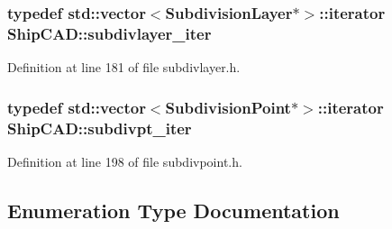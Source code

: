 \subsubsection[{\texorpdfstring{subdivlayer\+\_\+iter}{subdivlayer_iter}}]{\setlength{\rightskip}{0pt plus 5cm}typedef std\+::vector$<${\bf Subdivision\+Layer}$\ast$$>$\+::iterator {\bf Ship\+C\+A\+D\+::subdivlayer\+\_\+iter}}\hypertarget{namespaceShipCAD_a2e2f532082837a6a283b3660d991a974}{}\label{namespaceShipCAD_a2e2f532082837a6a283b3660d991a974}


Definition at line 181 of file subdivlayer.\+h.

\subsubsection[{\texorpdfstring{subdivpt\+\_\+iter}{subdivpt_iter}}]{\setlength{\rightskip}{0pt plus 5cm}typedef std\+::vector$<${\bf Subdivision\+Point}$\ast$$>$\+::iterator {\bf Ship\+C\+A\+D\+::subdivpt\+\_\+iter}}\hypertarget{namespaceShipCAD_a61bebf1ead1dfa9fc86ab99b1025f66a}{}\label{namespaceShipCAD_a61bebf1ead1dfa9fc86ab99b1025f66a}


Definition at line 198 of file subdivpoint.\+h.



\subsection{Enumeration Type Documentation}
